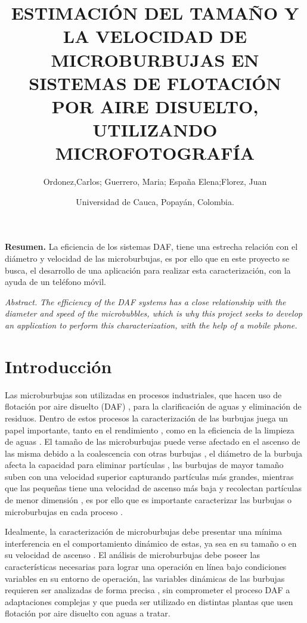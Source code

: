 \documentclass[12pt,twocolumn,a4paper]{article}
\title{ESTIMACIÓN DEL TAMAÑO Y LA VELOCIDAD DE
MICROBURBUJAS EN SISTEMAS DE FLOTACIÓN POR
AIRE DISUELTO, UTILIZANDO MICROFOTOGRAFÍA}
\author{Ordonez,Carlos;  Guerrero, Maria; España Elena;Florez, Juan 
 \\ 
\and{Universidad de Cauca, Popayán, Colombia.}\\
}
\begin{document}
\maketitle
\textbf{Resumen.}
La eficiencia de los sistemas DAF, tiene una estrecha relación con el diámetro y velocidad de las microburbujas, es por ello que en este proyecto se busca, el desarrollo de una aplicación para realizar esta caracterización, con la ayuda de un teléfono móvil. 

\textit{Abstract.}  
\textit{The efficiency of the DAF systems has a close relationship with the diameter and speed of the microbubbles, which is why this project seeks to develop an application to perform this characterization, with the help of a mobile phone.}

\section{Introducción}

Las microburbujas son utilizadas en procesos industriales, que hacen uso de flotación por aire disuelto (DAF) \cite{cheng2016bubble}, para la clarificación de aguas y eliminación de residuos. Dentro de estos procesos la caracterización de las burbujas juega un papel importante, tanto en el rendimiento \cite{gulden2018online} \cite{eskanlou2018interactional} \cite{reis2016study}, como en la eficiencia de la limpieza de aguas \cite{sadeghi2020experimental} \cite{fanaie2020effect}. El tamaño de las microburbujas puede verse afectado en el ascenso de las misma debido a la coalescencia con otras burbujas \cite{fanaie2020effect}, el diámetro de la burbuja afecta la capacidad para eliminar partículas \cite{sadeghi2020experimental}, las burbujas de mayor tamaño suben con una velocidad superior capturando partículas más grandes, mientras que las pequeñas tiene una velocidad de ascenso más baja y recolectan partículas de menor dimensión \cite{sadeghi2020experimental} \cite{brasileiro2020construction}, es por ello que es importante caracterizar las burbujas o microburbujas en cada proceso \cite{sadeghi2020experimental} \cite{ahmadi2014nano}.


Idealmente, la caracterización de microburbujas debe presentar una mínima interferencia en el comportamiento dinámico de estas, ya sea en su tamaño o en su velocidad de ascenso \cite{gulden2018online}. El análisis de microburbujas debe poseer las características necesarias para lograr una operación en línea  bajo condiciones variables en su entorno de operación, las variables dinámicas de las burbujas requieren ser analizadas de forma precisa \cite{parmar2015terminal}, sin comprometer el proceso DAF a adaptaciones complejas y que pueda ser utilizado en distintas plantas que usen flotación por aire disuelto con aguas a tratar.
\end{document}
